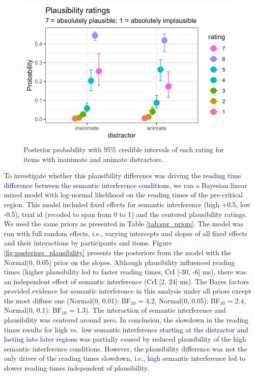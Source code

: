 \documentclass[review,preprint,12pt,authoryear,floatsintext]{elsarticle}
\begin{document}
\begin{figure}[htpb]
    \centering
        \caption{Posterior probability with 95\% credible intervals of each rating for items with inanimate and animate distractors.}
    \label{fig:plausibility_anim_inanim}
    \includegraphics[width=0.8\linewidth]{plausibility_anim_inan.jpg}
\end{figure}

To investigate whether this plausibility difference was driving the \textcolor{blue}{reading time difference between the semantic interference conditions}, we ran a Bayesian linear mixed model with log-normal likelihood on the reading times of the pre-critical region. This model included fixed effects for semantic interference (high +0.5, low -0.5), trial id (recoded to span from 0 to 1) and the centered plausibility ratings. We used the same priors as presented in Table \ref{tab:spr_priors}. The model was run with full random effects, i.e., varying intercepts and slopes of all fixed effects and their interactions by participants and items. Figure \ref{fig:posteriors_plausibility} presents the posteriors from the model with the Normal(0, 0.05) prior on the slopes. Although plausibility influenced reading times (higher plausibility led to faster reading times, CrI [-30, -6] ms), there was an independent effect of semantic interference (CrI [2, 24] ms). The Bayes factors provided evidence for semantic interference in this analysis under all priors except the most diffuse one (Normal(0, 0.01): BF$_{10}$ = 4.2,
Normal(0, 0.05): BF$_{10}$ = 2.4,
Normal(0, 0.1): BF$_{10}$ = 1.3). The interaction of semantic interference and plausibility was centered around zero. In conclusion, the slowdown in the reading times results for high vs.\ low semantic interference \textcolor{blue}{starting at the distractor and lasting into later regions} was partially caused by reduced plausibility of the high semantic interference conditions. However, the plausibility difference was not the only driver of the reading times slowdown, i.e., \textcolor{blue}{high} semantic interference led to slower reading times independent of plausibility.
\end{document}
